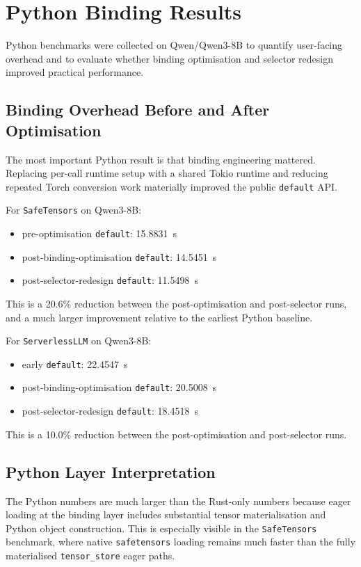 \section{Python Binding Results}

Python benchmarks were collected on Qwen/Qwen3-8B to quantify user-facing overhead and to evaluate whether binding optimisation and selector redesign improved practical performance.

\subsection{Binding Overhead Before and After Optimisation}

The most important Python result is that binding engineering mattered. Replacing per-call runtime setup with a shared Tokio runtime and reducing repeated Torch conversion work materially improved the public \texttt{default} API.

For \texttt{SafeTensors} on Qwen3-8B:

\begin{itemize}
\item pre-optimisation \texttt{default}: 15.8831~s
\item post-binding-optimisation \texttt{default}: 14.5451~s
\item post-selector-redesign \texttt{default}: 11.5498~s
\end{itemize}

This is a 20.6\% reduction between the post-optimisation and post-selector runs, and a much larger improvement relative to the earliest Python baseline.

For \texttt{ServerlessLLM} on Qwen3-8B:

\begin{itemize}
\item early \texttt{default}: 22.4547~s
\item post-binding-optimisation \texttt{default}: 20.5008~s
\item post-selector-redesign \texttt{default}: 18.4518~s
\end{itemize}

This is a 10.0\% reduction between the post-optimisation and post-selector runs.

\subsection{Python Layer Interpretation}

The Python numbers are much larger than the Rust-only numbers because eager loading at the binding layer includes substantial tensor materialisation and Python object construction. This is especially visible in the \texttt{SafeTensors} benchmark, where native \texttt{safetensors} loading remains much faster than the fully materialised \texttt{tensor\_store} eager paths.

